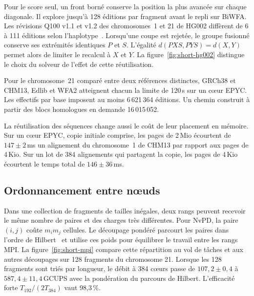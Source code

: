Pour le score seul, un front borné conserve la position la plus avancée sur chaque diagonale. Il explore jusqu’à 128 éditions par fragment avant le repli sur BiWFA. Les révisions Q100 v1.1 et v1.2 des chromosomes~1 et 21 de HG002 diffèrent de 6 à 111 éditions selon l’haplotype~\cite{hg002,hg002data}. Lorsqu’une coupe est rejetée, le groupe fusionné conserve ses extrémités identiques \(P\) et \(S\). L’égalité \(d(PXS,PYS)=d(X,Y)\) permet alors de limiter le recalcul à \(X\) et \(Y\). La figure~\ref{fig:short-hg002} distingue le choix du solveur de l’effet de cette réutilisation.

Pour le chromosome~21 comparé entre deux références distinctes, GRCh38 et CHM13, Edlib et WFA2 atteignent chacun la limite de 120\,s sur un cœur EPYC. Les effectifs par base imposent au moins 6\,621\,364 éditions. Un chemin construit à partir des blocs homologues en demande 16\,015\,052.

La réutilisation des séquences change aussi le coût de leur placement en mémoire. Sur un cœur EPYC, copie initiale comprise, les pages de 2\,Mio écourtent de \(147\pm2\)\,ms un alignement du chromosome~1 de CHM13 par rapport aux pages de 4\,Kio. Sur un lot de 384 alignements qui partagent la copie, les pages de 4\,Kio écourtent le temps total de \(146\pm36\)\,ms.


\subsection{Ordonnancement entre nœuds}
Dans une collection de fragments de tailles inégales, deux rangs peuvent recevoir le même nombre de paires et des charges très différentes. Pour NvPD, la paire \((i,j)\) coûte \(m_i m_j\) cellules. Le découpage pondéré parcourt les paires dans l’ordre de Hilbert~\cite{hilbert} et utilise ces poids pour équilibrer le travail entre les rangs MPI. La figure~\ref{fig:short-mpi} compare cette répartition au vol de tâches et aux autres découpages sur 128 fragments du chromosome 21.
Lorsque les 128 fragments sont triés par longueur, le débit à 384 cœurs passe de \(107{,}2\pm0{,}4\) à \(587{,}4\pm11{,}4\)\,GCUPS avec la pondération du parcours de Hilbert. L’efficacité forte \(T_{192}/(2T_{384})\) vaut 98,3\,\%.

